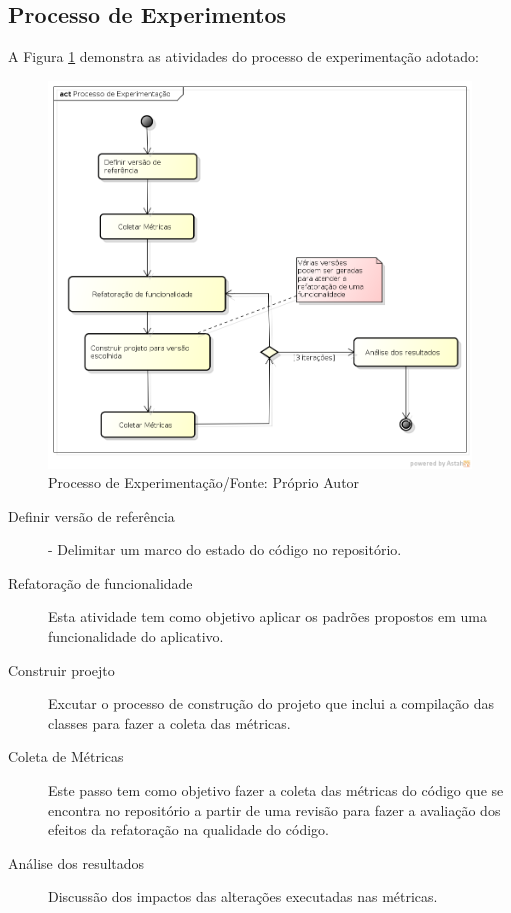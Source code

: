 \subsection{Processo de Experimentos}


A Figura \ref{processo_experimentacao} demonstra as atividades do processo de
experimentação adotado:
\begin{figure}[!h]
	\centering
	\includegraphics[scale=0.4]{img/processo_experimentacao.png}
	\caption[Processo de Experimentação]{Processo de Experimentação/Fonte: Próprio
	Autor}
	\label{processo_experimentacao}
\end{figure}

\begin{description}
\item[Definir versão de referência] - Delimitar um marco do estado do código no
repositório.
\item[Refatoração de funcionalidade] Esta atividade tem como objetivo aplicar os
padrões propostos em uma funcionalidade do aplicativo.
\item[Construir proejto] Excutar o processo de construção do projeto que inclui
a compilação das classes para fazer a coleta das métricas.
\item[Coleta de Métricas] Este passo tem como objetivo fazer a coleta
das métricas do código que se encontra no repositório a partir de uma revisão
para fazer a avaliação dos efeitos da refatoração na qualidade do código.
\item[Análise dos resultados] Discussão dos impactos das alterações executadas
nas métricas.
\end{description}


